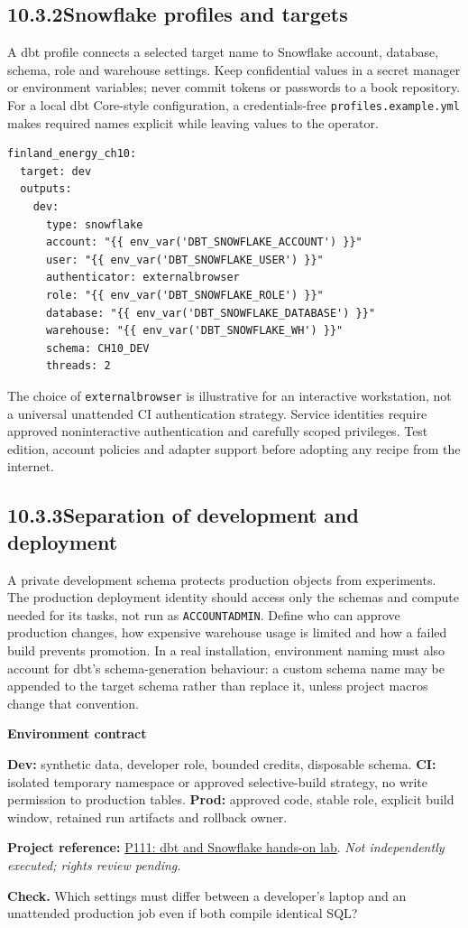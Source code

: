 \documentclass[11pt,twoside]{article}
\newcommand{\topic}[2]{\subsection*{#1\quad #2}}
\newcommand{\repo}[2]{\par\begingroup\fontsize{8.0}{9.6}\selectfont\sffamily\color{inkgray}\textbf{Project reference:} \href{#2}{#1}. \textit{Not independently executed; rights review pending.}\par\endgroup}
\begin{document}
\newpage
\topic{10.3.2}{Snowflake profiles and targets}
A dbt profile connects a selected target name to Snowflake account, database, schema, role and warehouse settings. Keep confidential values in a secret manager or environment variables; never commit tokens or passwords to a book repository. For a local dbt Core-style configuration, a credentials-free \texttt{profiles.example.yml} makes required names explicit while leaving values to the operator.
\begin{lstlisting}[caption={Environment-driven profile excerpt; no secrets provided.}]
finland_energy_ch10:
  target: dev
  outputs:
    dev:
      type: snowflake
      account: "{{ env_var('DBT_SNOWFLAKE_ACCOUNT') }}"
      user: "{{ env_var('DBT_SNOWFLAKE_USER') }}"
      authenticator: externalbrowser
      role: "{{ env_var('DBT_SNOWFLAKE_ROLE') }}"
      database: "{{ env_var('DBT_SNOWFLAKE_DATABASE') }}"
      warehouse: "{{ env_var('DBT_SNOWFLAKE_WH') }}"
      schema: CH10_DEV
      threads: 2
\end{lstlisting}
The choice of \texttt{externalbrowser} is illustrative for an interactive workstation, not a universal unattended CI authentication strategy. Service identities require approved noninteractive authentication and carefully scoped privileges. Test edition, account policies and adapter support before adopting any recipe from the internet.
\topic{10.3.3}{Separation of development and deployment}
A private development schema protects production objects from experiments. The production deployment identity should access only the schemas and compute needed for its tasks, not run as \texttt{ACCOUNTADMIN}. Define who can approve production changes, how expensive warehouse usage is limited and how a failed build prevents promotion. In a real installation, environment naming must also account for dbt's schema-generation behaviour: a custom schema name may be appended to the target schema rather than replace it, unless project macros change that convention.
\begin{whitebox}\textbf{Environment contract}\par
\textbf{Dev:} synthetic data, developer role, bounded credits, disposable schema. \textbf{CI:} isolated temporary namespace or approved selective-build strategy, no write permission to production tables. \textbf{Prod:} approved code, stable role, explicit build window, retained run artifacts and rollback owner.\end{whitebox}
\repo{P111: dbt and Snowflake hands-on lab}{https://github.com/dbt-labs/snowflake_sko_hol_2026}
\textbf{Check.} Which settings must differ between a developer's laptop and an unattended production job even if both compile identical SQL?
\newpage
\end{document}

